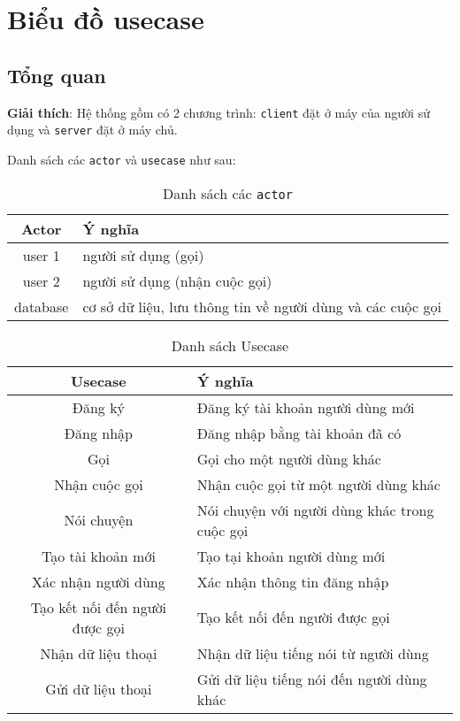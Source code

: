 \chapter {Biểu đồ usecase}
\section{Tổng quan}
    

    \textbf{Giải thích}:
    Hệ thống gồm có 2 chương trình: \texttt{client} đặt ở máy của người sử dụng
    và \texttt{server} đặt ở máy chủ.

    Danh sách các \texttt{actor} và \texttt{usecase} như sau:
    \begin{table}[ht]
        \centering
        \begin{tabular}{| c | l |}
            \hline
            Actor & Ý nghĩa \\
            \hline
            user 1 & người sử dụng (gọi) \\
            user 2 & người sử dụng (nhận cuộc gọi) \\
            database & cơ sở dữ liệu, lưu thông tin về người dùng và các cuộc
            gọi \\
            \hline
        \end{tabular}
        \caption{Danh sách các \texttt{actor}}
    \end{table}

    \begin{table}[ht]
        \centering
        \begin{tabular}{| c | l |}
            \hline
            Usecase & Ý nghĩa \\
            \hline
            Đăng ký & Đăng ký tài khoản người dùng mới \\
            Đăng nhập & Đăng nhập bằng tài khoản đã có \\
            Gọi & Gọi cho một người dùng khác \\
            Nhận cuộc gọi & Nhận cuộc gọi từ một người dùng khác \\
            Nói chuyện & Nói chuyện với người dùng khác trong cuộc gọi \\
            \hline
            Tạo tài khoản mới & Tạo tại khoản người dùng mới \\
            Xác nhận người dùng & Xác nhận thông tin đăng nhập \\
            Tạo kết nối đến người được gọi & Tạo kết nối đến người được gọi \\
            Nhận dữ liệu thoại & Nhận dữ liệu tiếng nói từ người dùng \\
            Gửi dữ liệu thoại & Gửi dữ liệu tiếng nói đến người dùng khác \\
            \hline
        \end{tabular}
        \caption{Danh sách Usecase}
    \end{table}

